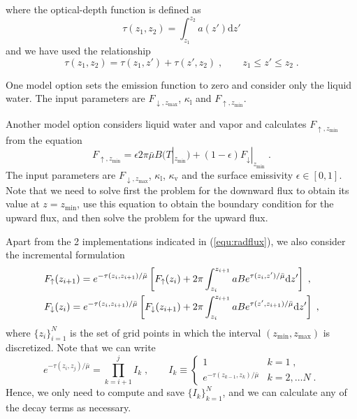 where the optical-depth function is defined as
\begin{equation}
    \tau(z_1, z_2) = \int_{z_1}^{z_2}a(z')\mathrm{d} z'
\end{equation}
and we have used the relationship
\begin{equation}
    \tau(z_1, z_2) = \tau(z_1, z') + \tau(z', z_2)\;,\qquad z_1\le z'\le z_2 \;.
\end{equation}

One model option sets the emission function to zero and consider only the liquid water. The input parameters are $F_{\downarrow,z_\mathrm{max}}$, $\kappa_\mathrm{l}$ and $F_{\uparrow,z_\mathrm{min}}$.

Another model option considers liquid water and vapor and calculates $F_{\uparrow,z_\mathrm{min}}$ from the equation
\begin{equation}
    F_{\uparrow,z_\mathrm{min}} = \epsilon 2\pi\bar{\mu} B(T|_{z_\mathrm{min}})+(1-\epsilon)F_\downarrow|_{z_\mathrm{min}} \;.
\end{equation}
The input parameters are $F_{\downarrow,z_\mathrm{max}}$, $\kappa_\mathrm{l}$, $\kappa_\mathrm{v}$ and the surface emissivity $\epsilon\in[0,1]$. Note that we need to solve first the problem for the downward flux to obtain its value at $z=z_\mathrm{min}$, use this equation to obtain the boundary condition for the upward flux, and then solve the problem for the upward flux.

Apart from the 2 implementations indicated in (\ref{equ:radflux}), we also consider the incremental formulation
\begin{subequations}\label{equ:radflux}
    \begin{align}
        &F_\uparrow(z_{i+1}) = e^{-\tau(z_i,z_{i+1})/\bar{\mu}}\left[ F_\uparrow(z_i) + 2\pi\int_{z_i}^{z_{i+1}} a B e^{\tau(z_i,z')/\bar{\mu}}\mathrm{d}z'\right]\notag  \;,\\
        &F_\downarrow(z_i) = e^{-\tau(z_i,z_{i+1})/\bar{\mu}}\left[ F_\downarrow(z_{i+1}) + 2\pi\int_{z_i}^{z_{i+1}} a B e^{\tau(z',z_{i+1})/\bar{\mu}}\mathrm{d}z'\right]\notag  \;,\\
    \end{align}
\end{subequations}
where $\{z_i\}_{i=1}^N$ is the set of grid points in which the interval $(z_\mathrm{min}, z_\mathrm{max})$ is discretized. Note that we can write
\begin{equation}
    e^{-\tau(z_i,z_j)/\bar{\mu}}=\prod_{k=i+1}^{j}I_k\;,\qquad 
    I_k\equiv\left\{
    \begin{array}{ll}
        1 & k=1\;,\\
        e^{-\tau(z_{k-1},z_k)/\bar{\mu}} & k=2,\ldots N \;.
    \end{array}
    \right.
\end{equation}
Hence, we only need to compute and save $\{I_k\}_{k=1}^N$, and we can calculate any of the decay terms as necessary.

